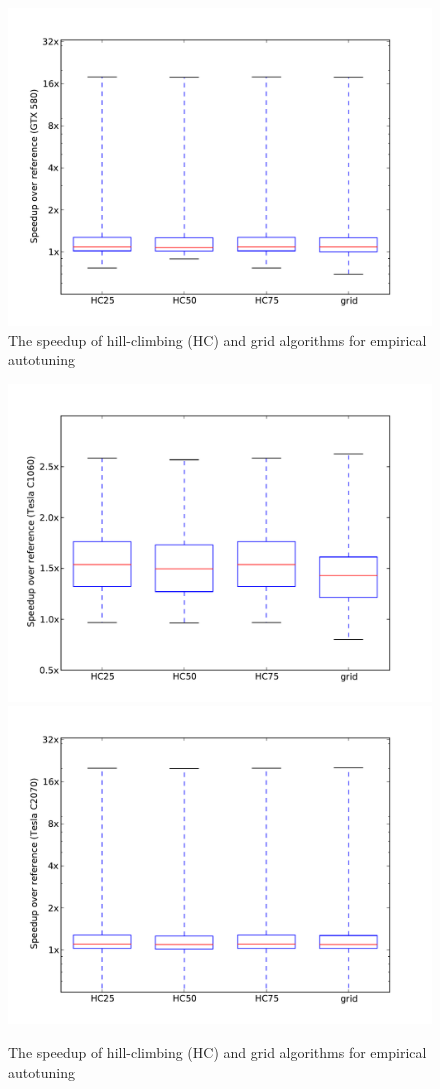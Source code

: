 \begin{figure}
\centering
\includegraphics[scale=.42]{fig_genX_munctional0_580.pdf}
\caption{The speedup of hill-climbing (HC) and grid algorithms for empirical autotuning}
\label{fig:speedup}
\end{figure}

\begin{figure}
\centering
\includegraphics[scale=.42]{fig_genX_munctional0_1060.pdf}
\includegraphics[scale=.42]{fig_genX_munctional0_2070.pdf}
\caption{The speedup of hill-climbing (HC) and grid algorithms for empirical autotuning}
\label{fig:speedup}
\end{figure}

